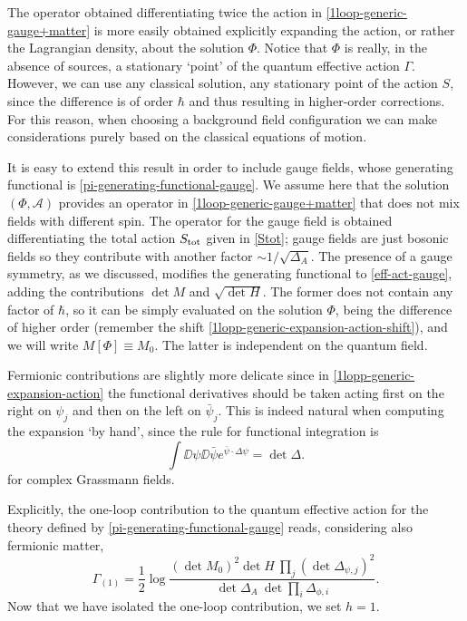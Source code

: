 The operator obtained differentiating twice the action in \eqref{1loop-generic-gauge+matter} is more easily obtained explicitly expanding the action, or rather the Lagrangian density, about the solution $\Phi$. Notice that $\Phi$ is really, in the absence of sources, a stationary `point' of the quantum effective action $\Gamma$. However, we can use any classical solution, \ie any stationary point of the action $S$, since the difference is of order $\hbar$ and thus resulting in higher-order corrections. For this reason, when choosing a background field configuration we can make considerations purely based on the classical equations of motion.

It is easy to extend this result in order to include gauge fields, whose generating functional is \eqref{pi-generating-functional-gauge}. We assume here that the solution $(\Phi,\mathcal{A})$ provides an operator in \eqref{1loop-generic-gauge+matter} that does not mix fields with different spin. The operator for the gauge field is obtained differentiating the total action $S_{ \text{tot} }$ given in \eqref{Stot}; gauge fields are just bosonic fields so they contribute with another factor \(\sim 1/\sqrt{\Delta_A}\). The presence of a gauge symmetry, as we discussed, modifies the generating functional to \eqref{eff-act-gauge}, adding the contributions $\det M$ and $ \sqrt{ \det H} $. The former  does not contain any factor of $\hbar$, so it can be simply evaluated on the solution $\Phi$, being the difference of higher order (remember the shift \eqref{1lopp-generic-expansion-action-shift}), and we will write $M[\Phi] \equiv M_0$. The latter is independent on the quantum field.


Fermionic contributions are slightly more delicate since in \eqref{1lopp-generic-expansion-action} the functional derivatives should be taken acting first on the right on $\psi_j$ and then on the left on $\bar \psi_j$. This is indeed natural when computing the expansion `by hand', since the rule for functional integration is
\begin{equation}
\int \DD{\psi} \DD{\bar \psi} e^{\bar \psi \cdot \Delta \psi} = {\det \Delta}.
\end{equation}
for complex Grassmann fields.

Explicitly, the one-loop contribution to the quantum effective action for the theory defined by \eqref{pi-generating-functional-gauge} reads, considering also fermionic matter,
\begin{equation}\label{eff-act-1loop-gauge}
\Gamma_{(1)}
	=
\frac{1}{2} \log \frac{ (\det M_0 )^2 \det H \  \prod_j (\det \Delta_{\psi,j})^2 }{\det \Delta_A \ \det \prod_i \Delta_{\phi,i} }.
\end{equation}
Now that we have isolated the one-loop contribution, we set $h=1$.




